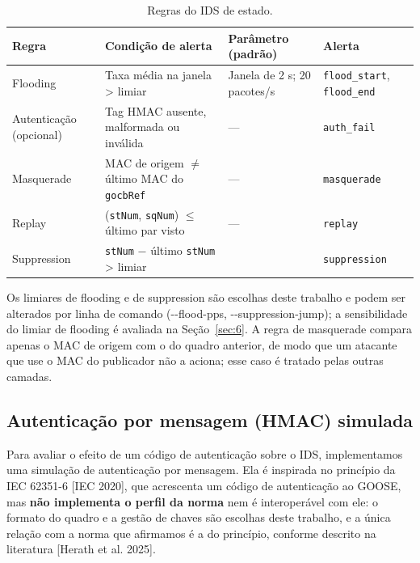\documentclass[12pt]{article}
\newcommand{\cit}[2]{[#1]\nocite{#2}}
\begin{document}
\begin{table}[!t]
\centering
\caption{Regras do IDS de estado.}\label{tab:10}
\footnotesize
\renewcommand{\arraystretch}{1.25}
\begin{tabularx}{\linewidth}{|>{\hsize=0.700\hsize\raggedright\arraybackslash}X|>{\hsize=2.027\hsize\raggedright\arraybackslash}X|>{\hsize=0.532\hsize\raggedright\arraybackslash}X|>{\hsize=0.741\hsize\raggedright\arraybackslash}X|}
\hline
\textbf{Regra} & \textbf{Condição de alerta} & \textbf{Parâmetro (padrão)} & \textbf{Alerta} \\ \hline
Flooding & Taxa média na janela > limiar & Janela de 2 s; 20 pacotes/s & \texttt{flood\_\allowbreak{}start}, \texttt{flood\_\allowbreak{}end} \\ \hline
Autenticação (opcional) & Tag HMAC ausente, malformada ou inválida & — & \texttt{auth\_\allowbreak{}fail} \\ \hline
Masquerade & MAC de origem \ensuremath{\neq} último MAC do \texttt{gocbRef} & — & \texttt{masquerade} \\ \hline
Replay & (\texttt{stNum}, \texttt{sqNum}) \ensuremath{\leq} último par visto & — & \texttt{replay} \\ \hline
Suppression & \texttt{stNum} \ensuremath{-} último \texttt{stNum} > limiar & 50 & \texttt{suppression} \\ \hline
\end{tabularx}
\end{table}

Os limiares de flooding e de suppression são escolhas deste trabalho e podem ser alterados por linha de comando (-{}-flood-pps, -{}-suppression-jump); a sensibilidade do limiar de flooding é avaliada na Seção~\ref{sec:6}. A regra de masquerade compara apenas o MAC de origem com o do quadro anterior, de modo que um atacante que use o MAC do publicador não a aciona; esse caso é tratado pelas outras camadas.

\subsection{Autenticação por mensagem (HMAC) simulada}\label{sec:5.2}

Para avaliar o efeito de um código de autenticação sobre o IDS, implementamos uma simulação de autenticação por mensagem. Ela é inspirada no princípio da IEC 62351-6 \cit{IEC 2020}{iec62351-6}, que acrescenta um código de autenticação ao GOOSE, mas \textbf{não implementa o perfil da norma} nem é interoperável com ele: o formato do quadro e a gestão de chaves são escolhas deste trabalho, e a única relação com a norma que afirmamos é a do princípio, conforme descrito na literatura \cit{Herath et al. 2025}{herath2025evaluation}.
\end{document}
